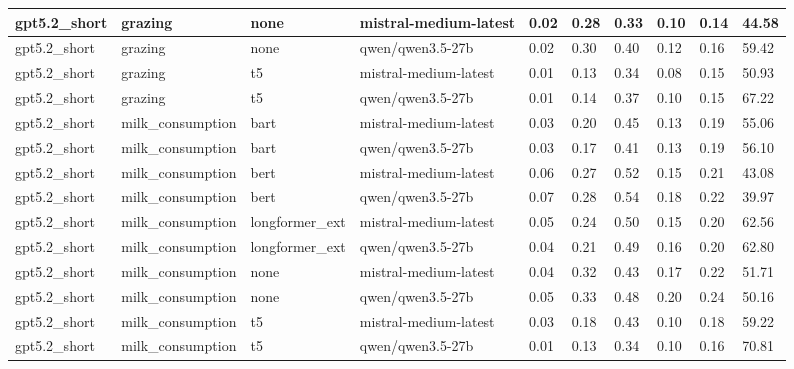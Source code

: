 \begin{tabular}{|l|l|l|l|l|l|l|l|l|l|}
 \hline
 gpt5.2\_short & grazing & none & mistral-medium-latest & 0.02 & 0.28 & 0.33 & 0.10 & 0.14 & 44.58 \\
 \hline
 gpt5.2\_short & grazing & none & qwen/qwen3.5-27b & 0.02 & 0.30 & 0.40 & 0.12 & 0.16 & 59.42 \\
 \hline
 gpt5.2\_short & grazing & t5 & mistral-medium-latest & 0.01 & 0.13 & 0.34 & 0.08 & 0.15 & 50.93 \\
 \hline
 gpt5.2\_short & grazing & t5 & qwen/qwen3.5-27b & 0.01 & 0.14 & 0.37 & 0.10 & 0.15 & 67.22 \\
 \hline
 gpt5.2\_short & milk\_consumption & bart & mistral-medium-latest & 0.03 & 0.20 & 0.45 & 0.13 & 0.19 & 55.06 \\
 \hline
 gpt5.2\_short & milk\_consumption & bart & qwen/qwen3.5-27b & 0.03 & 0.17 & 0.41 & 0.13 & 0.19 & 56.10 \\
 \hline
 gpt5.2\_short & milk\_consumption & bert & mistral-medium-latest & 0.06 & 0.27 & 0.52 & 0.15 & 0.21 & 43.08 \\
 \hline
 gpt5.2\_short & milk\_consumption & bert & qwen/qwen3.5-27b & 0.07 & 0.28 & 0.54 & 0.18 & 0.22 & 39.97 \\
 \hline
 gpt5.2\_short & milk\_consumption & longformer\_ext & mistral-medium-latest & 0.05 & 0.24 & 0.50 & 0.15 & 0.20 & 62.56 \\
 \hline
 gpt5.2\_short & milk\_consumption & longformer\_ext & qwen/qwen3.5-27b & 0.04 & 0.21 & 0.49 & 0.16 & 0.20 & 62.80 \\
 \hline
 gpt5.2\_short & milk\_consumption & none & mistral-medium-latest & 0.04 & 0.32 & 0.43 & 0.17 & 0.22 & 51.71 \\
 \hline
 gpt5.2\_short & milk\_consumption & none & qwen/qwen3.5-27b & 0.05 & 0.33 & 0.48 & 0.20 & 0.24 & 50.16 \\
 \hline
 gpt5.2\_short & milk\_consumption & t5 & mistral-medium-latest & 0.03 & 0.18 & 0.43 & 0.10 & 0.18 & 59.22 \\
 \hline
 gpt5.2\_short & milk\_consumption & t5 & qwen/qwen3.5-27b & 0.01 & 0.13 & 0.34 & 0.10 & 0.16 & 70.81 \\
\hline
\end{tabular}
